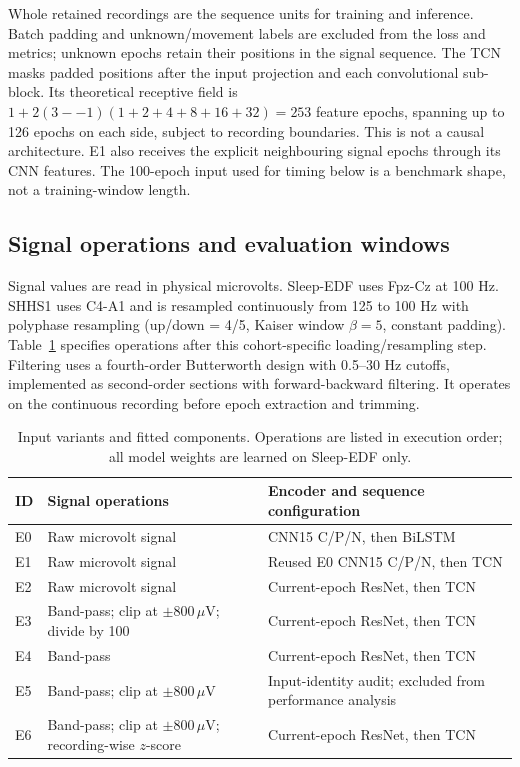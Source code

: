 \documentclass[10pt,a4paper]{article}
\begin{document}
Whole retained recordings are the sequence units for training and inference. Batch padding and
unknown/movement labels are excluded from the loss and metrics; unknown epochs retain their
positions in the signal sequence. The TCN masks padded positions after the input projection and
each convolutional sub-block. Its theoretical receptive field is
$1+2(3--1)(1+2+4+8+16+32)=253$ feature epochs, spanning up to 126 epochs on each side, subject to
recording boundaries. This is not a causal architecture. E1 also receives the explicit neighbouring
signal epochs through its CNN features. The 100-epoch input used for timing below is a benchmark
shape, not a training-window length.

\subsection*{Signal operations and evaluation windows}

Signal values are read in physical microvolts. Sleep-EDF uses Fpz-Cz at 100 Hz. SHHS1 uses C4-A1
and is resampled continuously from 125 to 100 Hz with polyphase resampling (up/down = 4/5,
Kaiser window $\beta=5$, constant padding). Table~\ref{tab:sup_variants} specifies operations after
this cohort-specific loading/resampling step. Filtering uses a fourth-order Butterworth design
with 0.5--30 Hz cutoffs, implemented as second-order sections with forward-backward filtering.
It operates on the continuous recording before epoch extraction and trimming.

\begin{table}[H]
\centering\small
\caption{Input variants and fitted components. Operations are listed in execution order; all
model weights are learned on Sleep-EDF only.}
\label{tab:sup_variants}
\begin{tabularx}{\textwidth}{lXX}
\toprule
ID & Signal operations & Encoder and sequence configuration \\
\midrule
E0 & Raw microvolt signal & CNN15 C/P/N, then BiLSTM \\
E1 & Raw microvolt signal & Reused E0 CNN15 C/P/N, then TCN \\
E2 & Raw microvolt signal & Current-epoch ResNet, then TCN \\
E3 & Band-pass; clip at $\pm800\,\mu$V; divide by 100 & Current-epoch ResNet, then TCN \\
E4 & Band-pass & Current-epoch ResNet, then TCN \\
E5 & Band-pass; clip at $\pm800\,\mu$V & Input-identity audit; excluded from performance analysis \\
E6 & Band-pass; clip at $\pm800\,\mu$V; recording-wise $z$-score & Current-epoch ResNet, then TCN \\
\bottomrule
\end{tabularx}
\end{table}
\end{document}
